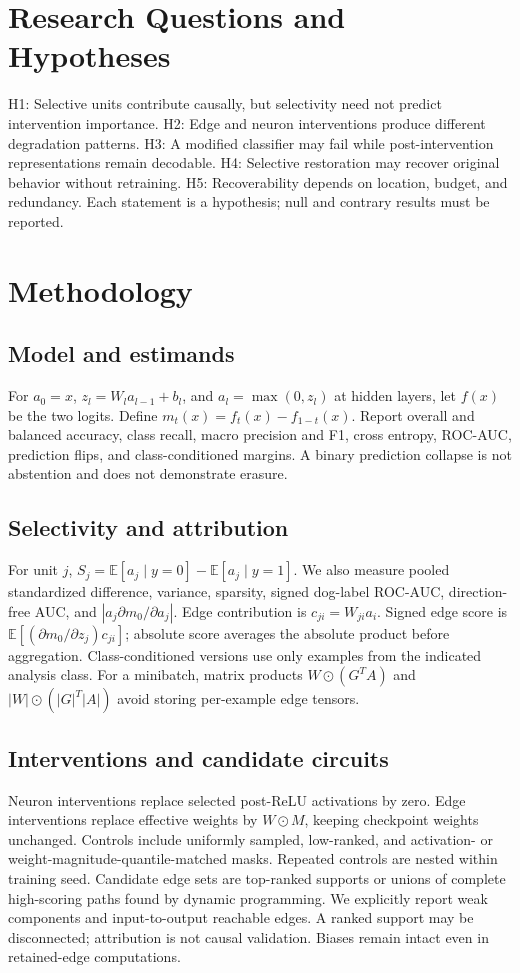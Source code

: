 \documentclass[11pt]{article}
\begin{document}
\section{Research Questions and Hypotheses}
H1: Selective units contribute causally, but selectivity need not predict intervention importance. H2: Edge and neuron interventions produce different degradation patterns. H3: A modified classifier may fail while post-intervention representations remain decodable. H4: Selective restoration may recover original behavior without retraining. H5: Recoverability depends on location, budget, and redundancy. Each statement is a hypothesis; null and contrary results must be reported.
\section{Methodology}
\subsection{Model and estimands}
For $a_0=x$, $z_l=W_la_{l-1}+b_l$, and $a_l=\max(0,z_l)$ at hidden layers, let $f(x)$ be the two logits. Define $m_t(x)=f_t(x)-f_{1-t}(x)$. Report overall and balanced accuracy, class recall, macro precision and F1, cross entropy, ROC-AUC, prediction flips, and class-conditioned margins. A binary prediction collapse is not abstention and does not demonstrate erasure.
\subsection{Selectivity and attribution}
For unit $j$, $S_j=\mathbb E[a_j\mid y=0]-\mathbb E[a_j\mid y=1]$. We also measure pooled standardized difference, variance, sparsity, signed dog-label ROC-AUC, direction-free AUC, and $|a_j\partial m_0/\partial a_j|$. Edge contribution is $c_{ji}=W_{ji}a_i$. Signed edge score is $\mathbb E[(\partial m_0/\partial z_j)c_{ji}]$; absolute score averages the absolute product before aggregation. Class-conditioned versions use only examples from the indicated analysis class. For a minibatch, matrix products $W\odot(G^TA)$ and $|W|\odot(|G|^T|A|)$ avoid storing per-example edge tensors.
\subsection{Interventions and candidate circuits}
Neuron interventions replace selected post-ReLU activations by zero. Edge interventions replace effective weights by $W\odot M$, keeping checkpoint weights unchanged. Controls include uniformly sampled, low-ranked, and activation- or weight-magnitude-quantile-matched masks. Repeated controls are nested within training seed. Candidate edge sets are top-ranked supports or unions of complete high-scoring paths found by dynamic programming. We explicitly report weak components and input-to-output reachable edges. A ranked support may be disconnected; attribution is not causal validation. Biases remain intact even in retained-edge computations.
\end{document}
